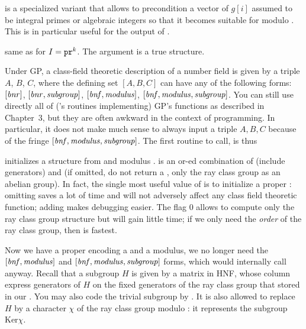  is a
specialized variant that allows to precondition a vector of $g[i]$ assumed to
be integral primes or algebraic integers so that it becomes suitable for
 modulo . This is in particular
useful for the output of .

 same as
 for $I = {\tt pr}^k$. The  argument is a true 
structure.


Under GP, a class-field theoretic description of a number field is given by a
triple $A$, $B$, $C$, where the defining set $[A,B,C]$ can have any of the
following forms: $[\hbox{\it bnr\/}]$, $[\hbox{\it bnr\/},\hbox{\it subgroup\/}]$,
$[\hbox{\it bnf\/},\hbox{\it modulus\/}]$, $[\hbox{\it bnf\/},\hbox{\it modulus\/},\hbox{\it subgroup\/}]$.
You can still use directly all of ('s routines implementing) GP's
functions as described in Chapter~3, but they are often awkward in the context
of  programming. In particular, it does not make much sense to
always input a triple $A,B,C$ because of the fringe
$[\hbox{\it bnf\/},\hbox{\it modulus\/},\hbox{\it subgroup\/}]$. The first routine to call, is
thus

 initializes a 
structure from  and modulus .  is an or-ed
combination of  (include generators) and  (if
omitted, do not return a , only the ray class group as an abelian
group). In fact, the single most useful value of  is
 to initialize a proper : omitting
 saves a lot of time and will not adversely affect
any class field theoretic function; adding  makes debugging
easier. The flag 0 allows to compute only the ray class group structure but
will gain little time; if we only need the \emph{order} of the ray class
group, then  is fastest.

Now we have a proper  encoding a  and a modulus, we no longer
need the $[\hbox{\it bnf\/},\hbox{\it modulus\/}]$ and
$[\hbox{\it bnf\/},\hbox{\it modulus\/},\hbox{\it subgroup\/}]$ forms, which would internally call
 anyway. Recall that a subgroup $H$ is given by a matrix in HNF,
whose column express generators of $H$ on the fixed generators of the ray class
group that stored in our . You may also code the trivial subgroup by
. It is also allowed to replace $H$ by a character $\chi$ of the ray
class group modulo : it represents the subgroup $\text{Ker} \chi$.

